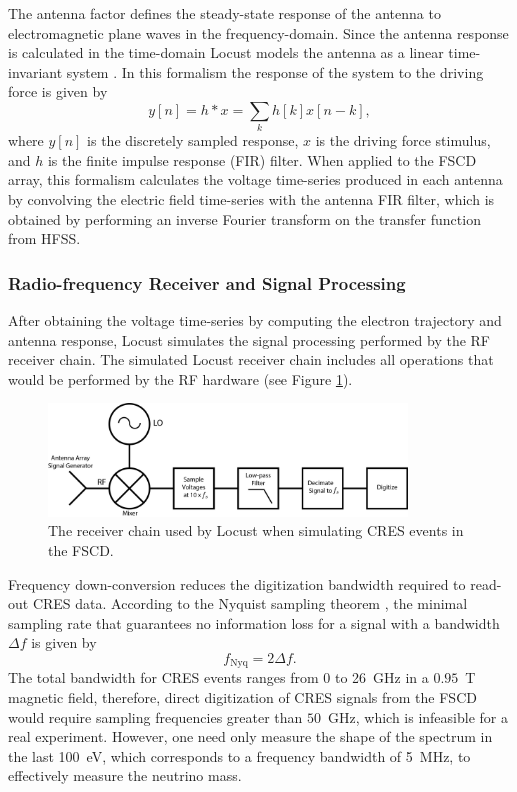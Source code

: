 The antenna factor defines the steady-state response of the antenna to electromagnetic plane waves in the frequency-domain. Since the antenna response is calculated in the time-domain Locust models the antenna as a linear time-invariant system \cite{lti_theory_wiki}. In this formalism the response of the system to the driving force is given by 
\begin{equation}
    y[n] = h\ast x=\sum_{k}{h[k]x[n-k]},
\end{equation}
where $y[n]$ is the discretely sampled response, $x$ is the driving force stimulus, and $h$ is the finite impulse response (FIR) filter. When applied to the FSCD array, this formalism calculates the voltage time-series produced in each antenna by convolving the electric field time-series with the antenna FIR filter, which is obtained by performing an inverse Fourier transform on the transfer function from HFSS. 

\subsubsection*{Radio-frequency Receiver and Signal Processing}

After obtaining the voltage time-series by computing the electron trajectory and antenna response, Locust simulates the signal processing performed by the RF receiver chain. The simulated Locust receiver chain includes all operations that would be performed by the RF hardware (see Figure \ref{fig:chap4-locust-receiver-chain}). 

\begin{figure}[htbp]
    \centering
    \includegraphics[width=0.85\textwidth]{figs/Chapter-4/230511_locust_receiver_chain.png}
    \caption{The receiver chain used by Locust when simulating CRES events in the FSCD.}
\label{fig:chap4-locust-receiver-chain}
\end{figure}

Frequency down-conversion reduces the digitization bandwidth required to read-out CRES data. According to the Nyquist sampling theorem \cite{nyquist_sampling}, the minimal sampling rate that guarantees no information loss for a signal with a bandwidth $\Delta f$ is given by
\begin{equation}
    f_{\textrm{Nyq}}=2\Delta f.
\end{equation}
The total bandwidth for CRES events ranges from 0 to 26~GHz in a $0.95$~T magnetic field, therefore, direct digitization of CRES signals from the FSCD would require sampling frequencies greater than $50$~GHz, which is infeasible for a real experiment. However, one need only measure the shape of the spectrum in the last 100~eV, which corresponds to a frequency bandwidth of 5~MHz, to effectively measure the neutrino mass. 

